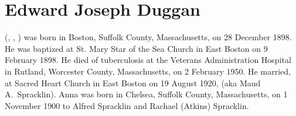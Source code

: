 \section{Edward Joseph Duggan}\label{per:Edward4Duggan}

 (, , ) was born in Boston, Suffolk County, Massachusetts, on 28 December 1898. He was baptized at St. Mary Star of the Sea Church in East Boston on 9 February 1898.\cite{Edward4DugganBirth} He died of tuberculosis at the Veterans Administration Hospital in Rutland, Worcester County, Massachusetts, on 2 February 1950.\cite{Edward4DugganDeath} He married, at Sacred Heart Church in East Boston on 19 August 1920, \cite{Edward4DugganMarriage} (aka Maud A.\ Spracklin). Anna was born in Chelsea, Suffolk County, Massachusetts, on 1 November 1900 to Alfred Spracklin and Rachael (Atkins) Spracklin.\cite{AnnaSpracklinBirth}
